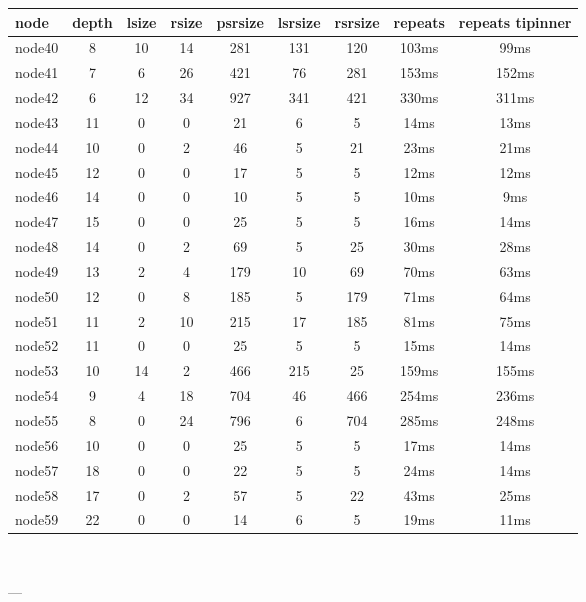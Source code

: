 \begin{tabular}{|l|c|c|c|c|c|c|c|c|}
\hline node & depth & lsize & rsize & psrsize & lsrsize & rsrsize   & repeats & repeats tipinner\\
    \hline node40 & 8 & 10 & 14 & 281 & 131 & 120 & 103ms & 99ms\\
    \hline node41 & 7 & 6 & 26 & 421 & 76 & 281 & 153ms & 152ms\\
    \hline node42 & 6 & 12 & 34 & 927 & 341 & 421 & 330ms & 311ms\\
    \hline node43 & 11 & 0 & 0 & 21 & 6 & 5 & 14ms & 13ms\\
    \hline node44 & 10 & 0 & 2 & 46 & 5 & 21 & 23ms & 21ms\\
    \hline node45 & 12 & 0 & 0 & 17 & 5 & 5 & 12ms & 12ms\\
    \hline node46 & 14 & 0 & 0 & 10 & 5 & 5 & 10ms & 9ms\\
    \hline node47 & 15 & 0 & 0 & 25 & 5 & 5 & 16ms & 14ms\\
    \hline node48 & 14 & 0 & 2 & 69 & 5 & 25 & 30ms & 28ms\\
    \hline node49 & 13 & 2 & 4 & 179 & 10 & 69 & 70ms & 63ms\\
    \hline node50 & 12 & 0 & 8 & 185 & 5 & 179 & 71ms & 64ms\\
    \hline node51 & 11 & 2 & 10 & 215 & 17 & 185 & 81ms & 75ms\\
    \hline node52 & 11 & 0 & 0 & 25 & 5 & 5 & 15ms & 14ms\\
    \hline node53 & 10 & 14 & 2 & 466 & 215 & 25 & 159ms & 155ms\\
    \hline node54 & 9 & 4 & 18 & 704 & 46 & 466 & 254ms & 236ms\\
    \hline node55 & 8 & 0 & 24 & 796 & 6 & 704 & 285ms & 248ms\\
    \hline node56 & 10 & 0 & 0 & 25 & 5 & 5 & 17ms & 14ms\\
    \hline node57 & 18 & 0 & 0 & 22 & 5 & 5 & 24ms & 14ms\\
    \hline node58 & 17 & 0 & 2 & 57 & 5 & 22 & 43ms & 25ms\\
    \hline node59 & 22 & 0 & 0 & 14 & 6 & 5 & 19ms & 11ms\\

\hline
\end{tabular} \

---


